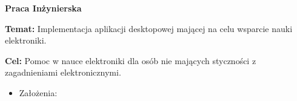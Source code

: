 \documentclass[11pt,a4paper]{article}
\begin{document}
\begin{center}
		{\large \textbf{Praca Inżynierska}}
\end{center}

\begin{center}
	\Large 
\end{center}


\textbf{Temat:} 
Implementacja aplikacji desktopowej mającej na celu wsparcie nauki elektroniki.

\textbf{Cel:} 
Pomoc w nauce elektroniki dla osób nie mających styczności z zagadnieniami elektronicznymi.

\begin{itemize}
    \item Założenia:
  \end{itemize}
\end{document}

